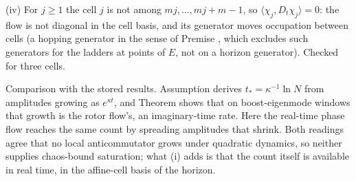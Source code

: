 (iv) For $j \ge 1$ the cell $j$ is not among $mj, \dots, mj + m - 1$, so $\langle\chi_{j}, D_{t}\chi_{j}\rangle = 0$: the flow is not diagonal in the cell basis, and its generator moves occupation between cells (a hopping generator in the sense of Premise , which excludes such generators for the ladders at points of $E$, not on a horizon generator). Checked for three cells.

Comparison with the stored results. Assumption  derives $t_{*} = \kappa^{-1}\ln N$ from amplitudes growing as $e^{\kappa t}$, and Theorem  shows that on boost-eigenmode windows that growth is the rotor flow's, an imaginary-time rate. Here the real-time phase flow reaches the same count by spreading amplitudes that shrink. Both readings agree that no local anticommutator grows under quadratic dynamics, so neither supplies chaos-bound saturation; what (i) adds is that the count itself is available in real time, in the affine-cell basis of the horizon.
